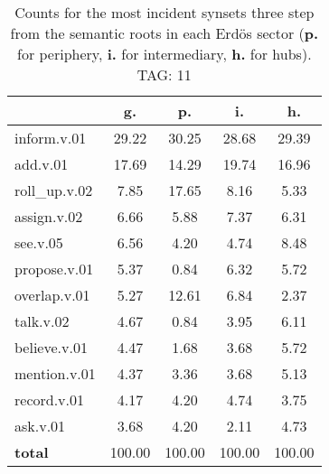 \begin{table}[h!]
\begin{center}
\begin{tabular}{| l || c | c | c | c |}\hline
 & {\bf g.} & {\bf p.} & {\bf i.} & {\bf h.} \\\hline\hline
inform.v.01 & 29.22  & 30.25  & 28.68  & 29.39 \\\hline
add.v.01 & 17.69  & 14.29  & 19.74  & 16.96 \\\hline
roll\_up.v.02 & 7.85  & 17.65  & 8.16  & 5.33 \\\hline
assign.v.02 & 6.66  & 5.88  & 7.37  & 6.31 \\\hline
see.v.05 & 6.56  & 4.20  & 4.74  & 8.48 \\\hline
propose.v.01 & 5.37  & 0.84  & 6.32  & 5.72 \\\hline
overlap.v.01 & 5.27  & 12.61  & 6.84  & 2.37 \\\hline
talk.v.02 & 4.67  & 0.84  & 3.95  & 6.11 \\\hline
believe.v.01 & 4.47  & 1.68  & 3.68  & 5.72 \\\hline
mention.v.01 & 4.37  & 3.36  & 3.68  & 5.13 \\\hline
record.v.01 & 4.17  & 4.20  & 4.74  & 3.75 \\\hline
ask.v.01 & 3.68  & 4.20  & 2.11  & 4.73 \\\hline\hline
{{\bf total}} & 100.00  & 100.00  & 100.00  & 100.00 \\\hline
\end{tabular}
\caption{Counts for the most incident synsets three step from the semantic roots in each Erd\"os sector ({\bf p.} for periphery, {\bf i.} for intermediary, {\bf h.} for hubs). TAG: 11}
\end{center}
\end{table}